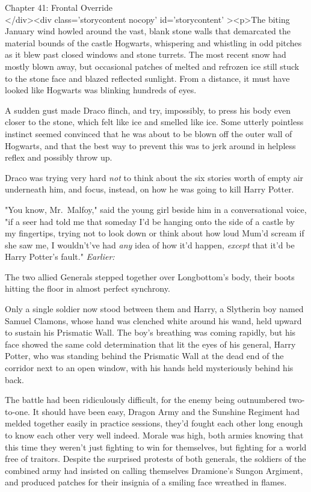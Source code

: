
Chapter 41: Frontal Override\\
</div><div  class='storycontent nocopy' id='storycontent' ><p>The biting 
January wind howled around the vast, blank stone walls that demarcated the 
material bounds of the castle Hogwarts, whispering and whistling in odd pitches 
as it blew past closed windows and stone turrets. The most recent snow had 
mostly blown away, but occasional patches of melted and refrozen ice still 
stuck to the stone face and blazed reflected sunlight. From a distance, it must 
have looked like Hogwarts was blinking hundreds of eyes.

A sudden gust made Draco flinch, and try, impossibly, to press his body even 
closer to the stone, which felt like ice and smelled like ice. Some utterly 
pointless instinct seemed convinced that he was about to be blown off the outer 
wall of Hogwarts, and that the best way to prevent this was to jerk around in 
helpless reflex and possibly throw up.

Draco was trying very hard \emph{not} to think about the six stories worth of 
empty air underneath him, and focus, instead, on how he was going to kill Harry 
Potter.

"You know, Mr.~Malfoy," said the young girl beside him in a conversational 
voice, "if a seer had told me that someday I'd be hanging onto the side of a 
castle by my fingertips, trying not to look down or think about how loud Mum'd 
scream if she saw me, I wouldn't've had \emph{any} idea of how it'd happen, 
\emph{except} that it'd be Harry Potter's fault."
\sbreak
\emph{Earlier:}

The two allied Generals stepped together over Longbottom's body, their boots 
hitting the floor in almost perfect synchrony.

Only a single soldier now stood between them and Harry, a Slytherin boy named 
Samuel Clamons, whose hand was clenched white around his wand, held upward to 
sustain his Prismatic Wall. The boy's breathing was coming rapidly, but his 
face showed the same cold determination that lit the eyes of his general, Harry 
Potter, who was standing behind the Prismatic Wall at the dead end of the 
corridor next to an open window, with his hands held mysteriously behind his 
back.

The battle had been ridiculously difficult, for the enemy being outnumbered 
two-to-one. It should have been easy, Dragon Army and the Sunshine Regiment had 
melded together easily in practice sessions, they'd fought each other long 
enough to know each other very well indeed. Morale was high, both armies 
knowing that this time they weren't just fighting to win for themselves, but 
fighting for a world free of traitors. Despite the surprised protests of both 
generals, the soldiers of the combined army had insisted on calling themselves 
Dramione's Sungon Argiment, and produced patches for their insignia of a 
smiling face wreathed in flames.


